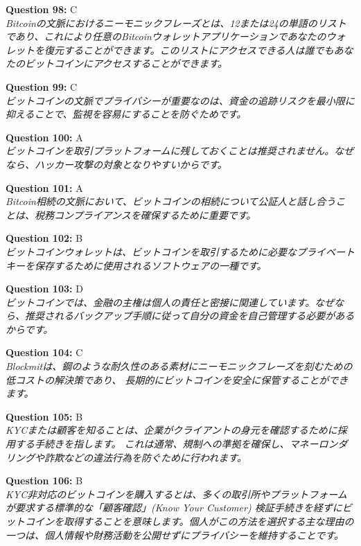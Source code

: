 \documentclass[12pt,a4paper]{article}
\begin{document}
\begin{enumerate}
{{{{{{\item \textbf{Question 98:} C
\\ \textit{Bitcoinの文脈におけるニーモニックフレーズとは、12または24の単語のリストであり、これにより任意のBitcoinウォレットアプリケーションであなたのウォレットを復元することができます。このリストにアクセスできる人は誰でもあなたのビットコインにアクセスすることができます。}

\item \textbf{Question 99:} C
\\ \textit{ビットコインの文脈でプライバシーが重要なのは、資金の追跡リスクを最小限に抑えることで、監視を容易にすることを防ぐためです。}

\item \textbf{Question 100:} A
\\ \textit{ビットコインを取引プラットフォームに残しておくことは推奨されません。なぜなら、ハッカー攻撃の対象となりやすいからです。}

\item \textbf{Question 101:} A
\\ \textit{Bitcoin相続の文脈において、ビットコインの相続について公証人と話し合うことは、税務コンプライアンスを確保するために重要です。}

\item \textbf{Question 102:} B
\\ \textit{ビットコインウォレットは、ビットコインを取引するために必要なプライベートキーを保存するために使用されるソフトウェアの一種です。}

\item \textbf{Question 103:} D
\\ \textit{ビットコインでは、金融の主権は個人の責任と密接に関連しています。なぜなら、推奨されるバックアップ手順に従って自分の資金を自己管理する必要があるからです。}

\item \textbf{Question 104:} C
\\ \textit{Blockmitは、鋼のような耐久性のある素材にニーモニックフレーズを刻むための低コストの解決策であり、
長期的にビットコインを安全に保管することができます。}

\item \textbf{Question 105:} B
\\ \textit{KYCまたは顧客を知ることは、企業がクライアントの身元を確認するために採用する手続きを指します。
これは通常、規制への準拠を確保し、マネーロンダリングや詐欺などの違法行為を防ぐために行われます。}

\item \textbf{Question 106:} B
\\ \textit{KYC非対応のビットコインを購入するとは、多くの取引所やプラットフォームが要求する標準的な「顧客確認」(Know Your Customer) 検証手続きを経ずにビットコインを取得することを意味します。個人がこの方法を選択する主な理由の一つは、個人情報や財務活動を公開せずにプライバシーを維持することです。}

}}}}}}
\end{enumerate}
\end{document}
